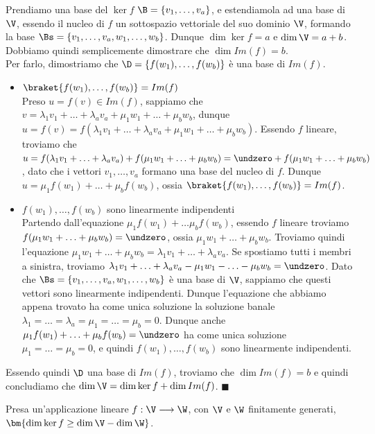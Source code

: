 \documentclass[11pt, a4paper, titlepage, oneside]{scrbook}
\begin{document}
Prendiamo una base del $\ker f$ $\B = \{v_1, \ldots, v_a\}$, e estendiamola ad una base di $\V$, essendo il nucleo di $f$ un sottospazio vettoriale del suo dominio $\V$, formando la base $\Bs = \{v_1, \ldots, v_a, w_1, \ldots, w_b\}$. Dunque $\dim \ker f = a$ e $\dim \V = a + b$. Dobbiamo quindi semplicemente dimostrare che $\dim Im(f) = b$. \\
Per farlo, dimostriamo che $\D = \{f(w_1), \ldots, f(w_b)\}$ è una base di $Im(f)$.
\begin{itemize}
    \item $\braket{f(w_1), \ldots, f(w_b)} = Im(f)$ \\
    Preso $u = f(v) \in Im(f)$, sappiamo che $v = \lambda_1 v_1 + \ldots + \lambda_a v_a + \mu_1 w_1 + \ldots + \mu_b w_b$, dunque $u = f(v) = f(\lambda_1 v_1 + \ldots + \lambda_a v_a + \mu_1 w_1 + \ldots + \mu_b w_b)$. Essendo $f$ lineare, troviamo che \mbox{$u = f(\lambda_1 v_1 + \ldots + \lambda_a v_a) + f(\mu_1 w_1 + \ldots + \mu_b w_b) = \undzero + f(\mu_1 w_1 + \ldots + \mu_b w_b)$}, dato che i vettori $v_1, \ldots, v_a$ formano una base del nucleo di $f$. 
    Dunque $u = \mu_1 f(w_1) + \ldots + \mu_b f(w_b)$, ossia $\braket{f(w_1), \ldots, f(w_b)} = Im(f)$.
    \item $f(w_1), \ldots, f(w_b)$ sono linearmente indipendenti \\
    Partendo dall'equazione $\mu_1 f(w_1) + \ldots \mu_b f(w_b)$, essendo $f$ lineare troviamo \mbox{$f(\mu_1 w_1 + \ldots + \mu_b w_b) = \undzero$}, ossia \mbox{$\mu_1 w_1 + \ldots + \mu_b w_b$}. Troviamo quindi l'equazione \mbox{$\mu_1 w_1 + \ldots + \mu_b w_b = \lambda_1 v_1 + \ldots + \lambda_a v_a$}. Se spostiamo tutti i membri a sinistra, troviamo \mbox{$\lambda_1 v_1 + \ldots + \lambda_a v_a - \mu_1 w_1 - \ldots - \mu_b w_b = \undzero$}. Dato che $\Bs = \{v_1, \ldots, v_a, w_1, \ldots, w_b\}$ è una base di $\V$, sappiamo che questi vettori sono linearmente indipendenti. Dunque l'equazione che abbiamo appena trovato ha come unica soluzione la soluzione banale $\lambda_1 =  \ldots = \lambda_a = \mu_1 = \ldots = \mu_b = 0$. Dunque anche \mbox{$\mu_1 f(w_1) + \ldots + \mu_b f(w_b) = \undzero$} ha come unica soluzione $\mu_1 = \ldots = \mu_b = 0$, e quindi $f(w_1), \ldots, f(w_b)$ sono linearmente indipendenti.
\end{itemize}

Essendo quindi $\D$ una base di $Im(f)$, troviamo che $\dim Im(f) = b$ e quindi concludiamo che $\dim \V = \dim \ker f + \dim Im(f)$. $\blacksquare$

\begin{Proposizione}[Corollario]
\label{corollario-dim-dominio-nucleo-im}
Presa un'applicazione lineare $f: \V \longrightarrow \W$, con $\V$ e $\W$ finitamente generati, \mbox{$\bm{\dim \ker f \geq \dim \V - \dim \W}$}.
\end{Proposizione}
\end{document}
